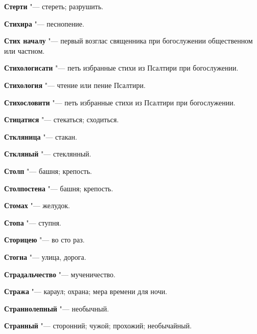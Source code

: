 \begin{mymulticols}{2}
\noindent\textbf{Стерти} "--- стереть; разрушить. 




\noindent\textbf{Стихира} "--- песнопение. 




\noindent\textbf{Стих началу} "--- первый возглас священника при богослужении общественном или частном. 




\noindent\textbf{Стихологисати} "--- петь избранные стихи из Псалтири при богослужении. 




\noindent\textbf{Стихология} "--- чтение или пение Псалтири. 




\noindent\textbf{Стихословити} "--- петь избранные стихи из Псалтири при богослужении. 




\noindent\textbf{Стицатися} "--- стекаться; сходиться. 




\noindent\textbf{Сткляница} "--- стакан. 




\noindent\textbf{Сткляный} "--- стеклянный. 




\noindent\textbf{Столп} "--- башня; крепость. 




\noindent\textbf{Столпостена} "--- башня; крепость. 




\noindent\textbf{Стомах} "--- желудок. 




\noindent\textbf{Стопа} "--- ступня. 




\noindent\textbf{Сторицею} "--- во сто раз. 




\noindent\textbf{Стогна} "--- улица, дорога. 




\noindent\textbf{Страдальчество} "--- мученичество. 




\noindent\textbf{Стража} "--- караул; охрана; мера времени для ночи. 




\noindent\textbf{Страннолепный} "--- необычный. 




\noindent\textbf{Странный} "--- сторонний; чужой; прохожий; необычайный. 





\end{mymulticols}
